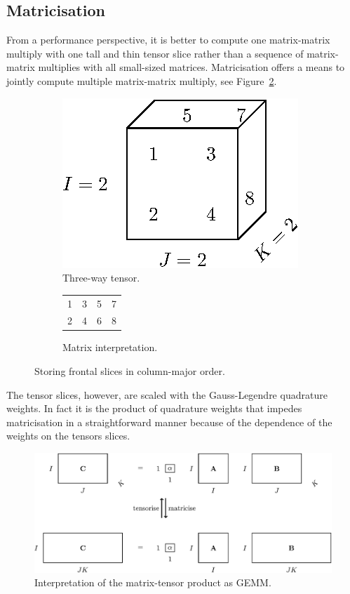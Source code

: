 \documentclass{acm_proc_article-sp}
\begin{document}
\subsection{Matricisation}\label{sec:matricisation}
From a performance perspective, it is better to compute one matrix-matrix multiply with one tall and thin tensor slice rather than a sequence of matrix-matrix multiplies with all small-sized matrices. Matricisation offers a means to jointly compute multiple matrix-matrix multiply, see Figure~\ref{fig:3}.  
\begin{figure}
\centering
\begin{subfigure}[b]{0.2\textwidth}
\centering
\includegraphics[scale=.6]{figures/figure4.eps}
\caption{Three-way tensor.}
\end{subfigure}
\begin{subfigure}[b]{0.2\textwidth}
\centering
\begin{tabular}{|cccc|}
\hline
1 & 3 & 5 & 7 \\
2 & 4 & 6 & 8 \\ \hline
\end{tabular}\vspace{1cm}
\caption{Matrix interpretation.}
\end{subfigure}
\caption{Storing frontal slices in column-major order.}\label{fig:4}
\end{figure}
The tensor slices, however, are scaled with the Gauss-Legendre quadrature weights. In fact it is the product of quadrature weights that impedes matricisation in a straightforward manner because of the dependence of the weights on the tensors slices. 


\begin{figure}[h!]
\centering
\includegraphics[width=.5\textwidth]{figures/figure3.eps}
\caption{Interpretation of the matrix-tensor product as GEMM.}\label{fig:3}
\end{figure}
\end{document}

